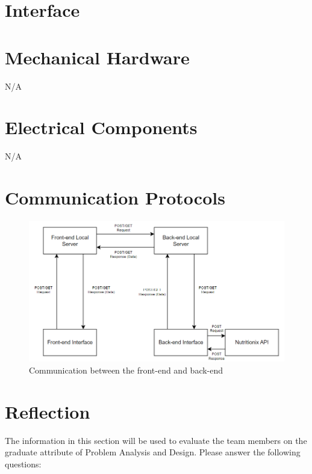 \documentclass[12pt, titlepage]{article}
\begin{document}
\newpage{}

\appendix

\section{Interface}


\section{Mechanical Hardware}

N/A

\section{Electrical Components}

N/A

\section{Communication Protocols}

\begin{figure}[H]
	\centering
	\includegraphics[scale=0.85]{Communication_Protocols.png}
	\caption{Communication between the front-end and back-end}
\end{figure}

\section{Reflection}

The information in this section will be used to evaluate the team members on the
graduate attribute of Problem Analysis and Design.  Please answer the following questions:
\end{document}
